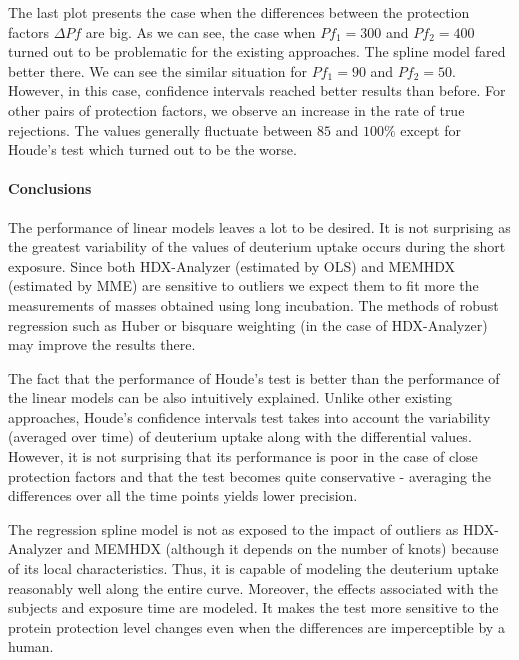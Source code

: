 \documentclass[]{MathAppl18}
\begin{document}
The last plot presents the case when the differences between the protection factors $\Delta Pf$ are big. As we can see, the case when $Pf_1 = 300$ and $Pf_2 = 400$ turned out to be problematic for the existing approaches. The spline model fared better there. We can see the similar situation for $Pf_1 = 90$ and $Pf_2 = 50$. However, in this case, confidence intervals reached better results than before. For other pairs of protection factors, we observe an increase in the rate of true rejections. The values generally fluctuate between $85$ and $100\%$ except for Houde's test which turned out to be the worse.





\paragraph{Conclusions}

The performance of linear models leaves a lot to be desired. It is not surprising as the greatest variability of the values of deuterium uptake occurs during the short exposure. Since both HDX-Analyzer (estimated by OLS) and MEMHDX (estimated by MME) are sensitive to outliers we expect them to fit more the measurements of masses obtained using long incubation. The methods of robust regression such as Huber or bisquare weighting (in the case of HDX-Analyzer) may improve the results there.

The fact that the performance of Houde's test is better than the performance of the linear models can be also intuitively explained. Unlike other existing approaches, Houde's confidence intervals test takes into account the variability (averaged over time) of deuterium uptake along with the differential values. However, it is not surprising that its performance is poor in the case of close protection factors and that the test becomes quite conservative - averaging the differences over all the time points yields lower precision.

The regression spline model is not as exposed to the impact of outliers as HDX-Analyzer and MEMHDX (although it depends on the number of knots) because of its local characteristics. Thus, it is capable of modeling the deuterium uptake reasonably well along the entire curve. Moreover, the effects associated with the subjects and exposure time are modeled. It makes the test more sensitive to the protein protection level changes even when the differences are imperceptible by a human. 
\end{document}
